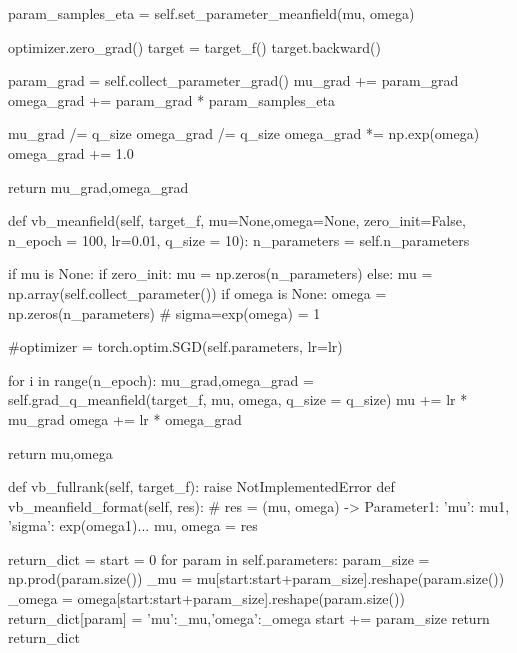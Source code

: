 \documentclass{article}
\begin{document}
\begin{python}
            param_samples_eta = self.set_parameter_meanfield(mu, omega)
            
            optimizer.zero_grad()
            target = target_f()
            target.backward()
            
            param_grad = self.collect_parameter_grad()
            mu_grad += param_grad
            omega_grad += param_grad * param_samples_eta
        
        mu_grad /= q_size
        omega_grad /= q_size
        omega_grad *= np.exp(omega)
        omega_grad += 1.0
        
        return mu_grad,omega_grad
            
    def vb_meanfield(self, target_f, mu=None,omega=None, zero_init=False, 
                     n_epoch = 100, lr=0.01, q_size = 10):
        n_parameters = self.n_parameters
        
        if mu is None:
            if zero_init:
                mu = np.zeros(n_parameters)
            else:
                mu = np.array(self.collect_parameter())
        if omega is None:
            omega = np.zeros(n_parameters) # sigma=exp(omega) = 1
        
        #optimizer = torch.optim.SGD(self.parameters, lr=lr)
        
        for i in range(n_epoch):
            mu_grad,omega_grad = self.grad_q_meanfield(target_f, mu, omega, q_size = q_size)
            mu += lr * mu_grad
            omega += lr * omega_grad
        
        return mu,omega
        
        
    def vb_fullrank(self, target_f):
        raise NotImplementedError
    def vb_meanfield_format(self, res):
        # res = (mu, omega) -> {Parameter1: {'mu': mu1, 'sigma': exp(omega1)}...}
        mu, omega = res
        
        return_dict = {}
        start = 0
        for param in self.parameters:
            param_size = np.prod(param.size())
            _mu = mu[start:start+param_size].reshape(param.size())
            _omega = omega[start:start+param_size].reshape(param.size())
            return_dict[param] = {'mu':_mu,'omega':_omega}
            start += param_size
        return return_dict


\end{python}
\end{document}
